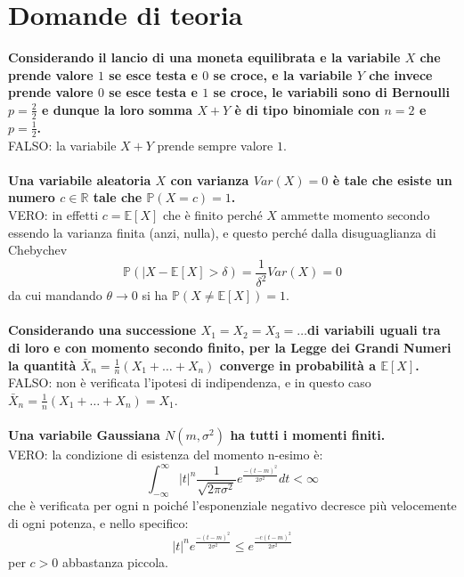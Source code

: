 \newpage
\section{Domande di teoria}

\textbf{Considerando il lancio di una moneta equilibrata e la variabile $X$ che prende valore $1$ se esce testa e $0$ se croce, e la variabile $Y$ che invece prende valore $0$ se esce testa e $1$ se croce, le variabili sono di Bernoulli $p = \frac{2}{2}$ e dunque la loro somma $X + Y$ è di tipo binomiale con $n = 2$ e $p = \frac{1}{2}$.}\\
FALSO: la variabile $X + Y$ prende sempre valore $1$.\\\\


\noindent\textbf{Una variabile aleatoria $X$ con varianza $Var(X) = 0$ è tale che esiste un numero $c \in \mathbb{R}$
tale che $\mathbb{P}(X = c) = 1$.}\\
VERO: in effetti $c = \mathbb{E}[X]$ che è finito perché $X$ ammette momento secondo essendo la varianza finita (anzi, nulla), e questo perché dalla disuguaglianza di Chebychev
\begin{equation*}
	\mathbb{P}(\lvert X - \mathbb{E}[X] > \delta) = \frac{1}{\delta^2}Var(X)=0
\end{equation*}
da cui mandando $\theta \to 0$ si ha $\mathbb{P}(X \neq \mathbb{E}[X])=1$.\\\\

\noindent\textbf{Considerando una successione $X_1 = X_2 = X_3 = \ldots$di variabili uguali tra di loro e con momento secondo finito, per la Legge dei Grandi Numeri la quantità $\bar{X}_n = \frac{1}{n}(X_1 + \ldots + X_n)$ converge in probabilità a $\mathbb{E}[X]$.}\\
FALSO: non è verificata l’ipotesi di indipendenza, e in questo caso $\bar{X}_n = \frac{1}{n}(X_1 + \ldots + X_n) = X_1$.\\\\

\noindent\textbf{Una variabile Gaussiana $N(m, \sigma^2)$ ha tutti i momenti finiti.}\\
VERO: la condizione di esistenza del momento n-esimo è:
\begin{equation*}
	\int_{-\infty}^{\infty} \lvert t \rvert^n \frac{1}{\sqrt{2\pi\sigma^2}}e^{\frac{-(t-m)^2}{2\sigma^2}}dt < \infty
\end{equation*}
che è verificata per ogni n poiché l’esponenziale negativo decresce più velocemente di ogni potenza, e nello specifico:
\begin{equation*}
	\lvert t \rvert^n e^{\frac{-(t-m)^2}{2\sigma^2}} \leq e^{\frac{-c(t-m)^2}{2\sigma^2}}
\end{equation*}
per $c>0$ abbastanza piccola.\\\\

